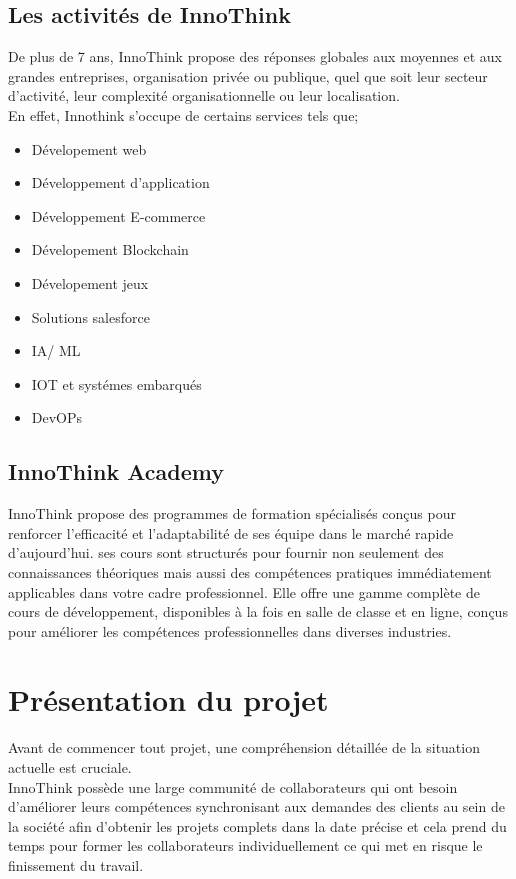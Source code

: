 \subsection{Les activités de InnoThink}
De plus de 7 ans, InnoThink propose des réponses globales aux moyennes et  aux grandes entreprises, organisation privée ou publique, quel que soit leur secteur d'activité, leur complexité organisationnelle ou leur localisation.
\\
En effet, Innothink s'occupe de certains services tels que;
\begin{itemize}

    \item Dévelopement web
    \item Développement d'application
    \item Développement E-commerce
    \item Dévelopement Blockchain
    \item Dévelopement jeux
    \item Solutions salesforce
    \item IA/ ML 
    \item IOT et systémes embarqués
    \item  DevOPs
\end{itemize}
\subsection{InnoThink Academy}
InnoThink propose des programmes de formation spécialisés conçus pour renforcer l'efficacité et l'adaptabilité de ses équipe dans le marché rapide d'aujourd'hui. ses cours sont structurés pour fournir non seulement des connaissances théoriques mais aussi des compétences pratiques immédiatement applicables dans votre cadre professionnel.
Elle offre une gamme complète de cours de développement, disponibles à la fois en salle de classe et en ligne, conçus pour améliorer les compétences professionnelles dans diverses industries.

\section{Présentation du projet}
Avant de commencer tout projet, une compréhension détaillée de la situation actuelle est 
cruciale.\\
InnoThink possède une large communité de collaborateurs qui ont besoin
d'améliorer leurs compétences synchronisant aux demandes des clients au sein de la société afin d'obtenir les projets complets dans la date précise et cela prend du temps pour former les collaborateurs individuellement ce qui met en risque le finissement du travail.

